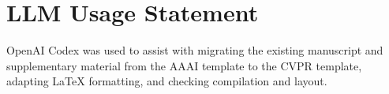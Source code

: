 \section*{LLM Usage Statement}
OpenAI Codex was used to assist with migrating the existing manuscript and supplementary material from the AAAI template to the CVPR template, adapting LaTeX formatting, and checking compilation and layout.

